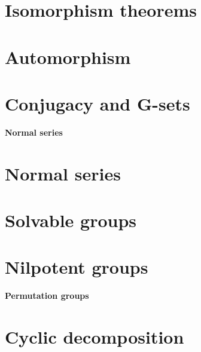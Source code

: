 \documentclass[twocolumn]{article}
\begin{document}
\section{Isomorphism theorems}
\setcounter{defi}{0}
\setcounter{teo}{0}
\setcounter{coro}{0}


\section{Automorphism}
\setcounter{defi}{0}
\setcounter{teo}{0}
\setcounter{coro}{0}


\section{Conjugacy and G-sets}
\setcounter{defi}{0}
\setcounter{teo}{0}
\setcounter{coro}{0}

\textbf{\Huge Normal series}
\section{Normal series}
\setcounter{defi}{0}
\setcounter{teo}{0}
\setcounter{coro}{0}


\section{Solvable groups}
\setcounter{defi}{0}
\setcounter{teo}{0}
\setcounter{coro}{0}


\section{Nilpotent groups}
\setcounter{defi}{0}
\setcounter{teo}{0}
\setcounter{coro}{0}



\textbf{\huge Permutation groups}
\section{Cyclic decomposition}
\setcounter{defi}{0}
\setcounter{teo}{0}
\setcounter{coro}{0}

\end{document}
